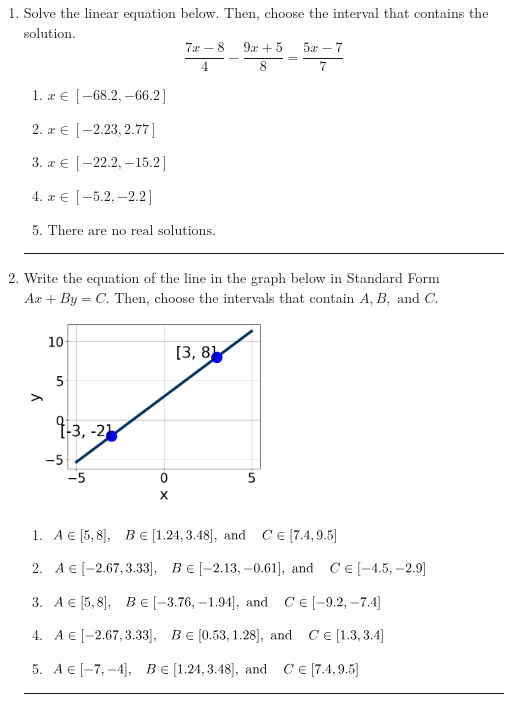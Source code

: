 \documentclass[14pt]{extbook}
\newcommand{\litem}[1]{\item#1\hspace*{-1cm}\rule{\textwidth}{0.4pt}}
\begin{document}
\begin{enumerate}
\litem{
Solve the linear equation below. Then, choose the interval that contains the solution.\[ \frac{7x -8}{4} - \frac{9x + 5}{8} = \frac{5x -7}{7} \]\begin{enumerate}[label=\Alph*.]
\item \( x \in [-68.2, -66.2] \)
\item \( x \in [-2.23, 2.77] \)
\item \( x \in [-22.2, -15.2] \)
\item \( x \in [-5.2, -2.2] \)
\item \( \text{There are no real solutions.} \)

\end{enumerate} }
\litem{
Write the equation of the line in the graph below in Standard Form $Ax+By=C$. Then, choose the intervals that contain $A, B, \text{ and } C$.
\begin{center}
    \includegraphics[width=0.5\textwidth]{../Figures/linearGraphToStandardCopyA.png}
\end{center}
\begin{enumerate}[label=\Alph*.]
\item \( A \in [5, 8], \hspace{3mm} B \in [1.24, 3.48], \text{ and } \hspace{3mm} C \in [7.4, 9.5] \)
\item \( A \in [-2.67, 3.33], \hspace{3mm} B \in [-2.13, -0.61], \text{ and } \hspace{3mm} C \in [-4.5, -2.9] \)
\item \( A \in [5, 8], \hspace{3mm} B \in [-3.76, -1.94], \text{ and } \hspace{3mm} C \in [-9.2, -7.4] \)
\item \( A \in [-2.67, 3.33], \hspace{3mm} B \in [0.53, 1.28], \text{ and } \hspace{3mm} C \in [1.3, 3.4] \)
\item \( A \in [-7, -4], \hspace{3mm} B \in [1.24, 3.48], \text{ and } \hspace{3mm} C \in [7.4, 9.5] \)


\end{enumerate}}
\end{enumerate}
\end{document}
